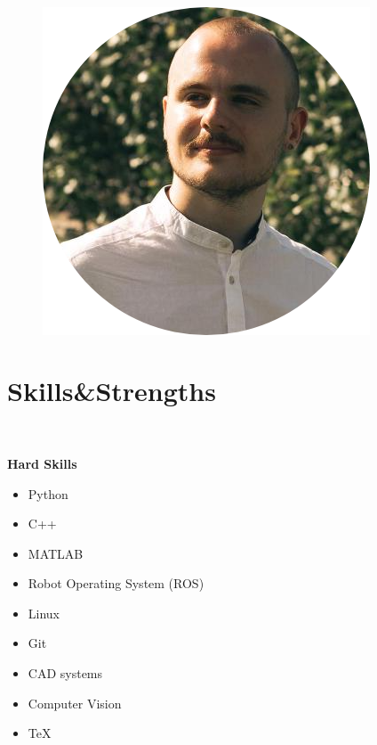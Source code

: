 \documentclass[]{friggeri-cv_reccius-experiment}
\begin{document}
\begin{aside}
    ~

\vspace{-3.5cm}
\begin{figure}[ht]
	\hspace{0.3cm}
	\includegraphics[width=.71\linewidth]{img/Ilya.png}
\end{figure}

\newcommand{\skillspace}{\vspace*{-0.75mm}}
  \vspace{-2.9mm}
  \section{Skills\thinspace \&\thinspace Strengths}\\
  \vspace{3.5mm}
    
	\textbf{Hard Skills}\\\vspace{0.4mm}
	\begin{itemize}[leftmargin=*, noitemsep]
	\item Python
	\item C++
	\item MATLAB
	\item Robot Operating System (ROS)
	\item Linux
	\item Git
	\item CAD systems
	\item Computer Vision
	\item TeX\\
	\end{itemize}	


\end{aside}
\end{document}
